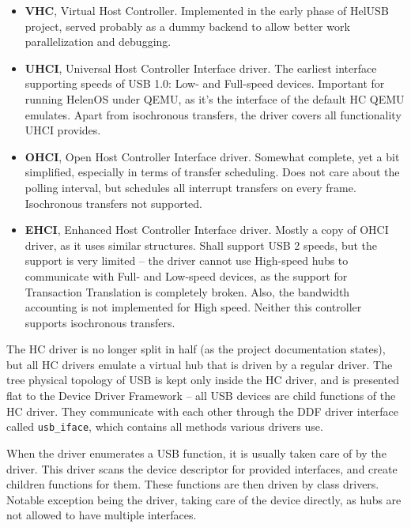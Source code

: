 \begin{itemize}
\item
	\textbf{VHC}, Virtual Host Controller. Implemented in the early phase of
	HelUSB project, served probably as a dummy backend to allow better work
	parallelization and debugging.

\item
	\textbf{UHCI}, Universal Host Controller Interface driver. The earliest
	interface supporting speeds of USB 1.0: Low- and Full-speed devices.
	Important for running HelenOS under QEMU, as it's the interface of the
	default HC QEMU emulates. Apart from isochronous transfers, the driver
	covers all functionality UHCI provides.

\item
	\textbf{OHCI}, Open Host Controller Interface driver. Somewhat complete,
	yet a bit simplified, especially in terms of transfer scheduling. Does not
	care about the polling interval, but schedules all interrupt transfers on
	every frame. Isochronous transfers not supported.

\item
	\textbf{EHCI}, Enhanced Host Controller Interface driver. Mostly a copy of
	OHCI driver, as it uses similar structures. Shall support USB 2 speeds, but
	the support is very limited -- the driver cannot use High-speed hubs to
	communicate with Full- and Low-speed devices, as the support for
	Transaction Translation is completely broken. Also, the bandwidth
	accounting is not implemented for High speed. Neither this controller
	supports isochronous transfers.
\end{itemize}

The HC driver is no longer split in half (as the project documentation states),
but all HC drivers emulate a virtual hub that is driven by a regular
 driver. The tree physical topology of USB is kept only inside the
HC driver, and is presented flat to the Device Driver Framework -- all USB
devices are child functions of the HC driver. They communicate with each other
through the DDF driver interface called \texttt{usb\_iface}, which contains all
methods various drivers use.

When the driver enumerates a USB function, it is usually taken care of by the
 driver. This driver scans the device descriptor for provided
interfaces, and create children functions for them. These functions are then
driven by class drivers. Notable exception being the  driver,
taking care of the device directly, as hubs are not allowed to have multiple
interfaces.


